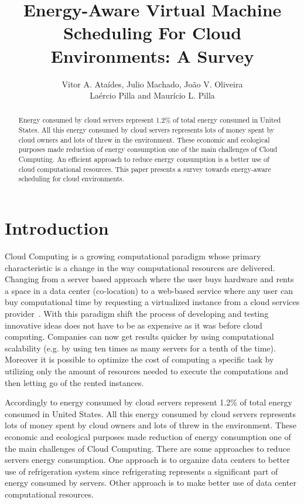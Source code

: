 \documentclass{article}
\title{Energy-Aware Virtual Machine Scheduling For Cloud Environments: A Survey}
\author{Vitor A. Ataídes\inst{1}, Julio Machado\inst{1}, João V. Oliveira\inst{1} \\ Laércio Pilla\inst{2} and  Maurício L. Pilla\inst{1}}
\begin{document}
\maketitle

\begin{abstract}
    Energy consumed by cloud servers represent 1.2\% of total energy consumed in United States. All this energy consumed by cloud servers represents lots of money spent by cloud owners and lots of  threw in the environment. These economic and ecological purposes made reduction of energy consumption one of the main challenges of Cloud Computing. An efficient approach to reduce energy consumption is a better use of cloud computational resources. This paper presents a survey towards energy-aware scheduling for cloud environments. 
\end{abstract}


\section{Introduction}

Cloud Computing is a growing computational paradigm whose primary characteristic is a change in the way computational resources are delivered. Changing from a server based approach where the user buys hardware and rents a space in a data center (co-location) to a web-based service where any user can buy computational time by requesting a virtualized instance from a cloud services provider~\cite{NIST:2011}. With this paradigm shift the process of developing and testing innovative ideas does not have to be as expensive as it was before cloud computing. Companies can now get results quicker by using computational scalability (e.g. by using ten times as many servers for a tenth of the time). Moreover it is possible to optimize the cost of computing a specific task by utilizing only the amount of resources needed to execute the computations and then letting go of the rented instances.

Accordingly to \cite{Koomey} energy consumed by cloud servers represent 1.2\% of total energy consumed in United States. All this energy consumed by cloud servers represents lots of money spent by cloud owners and lots of  threw in the environment. These economic and ecological purposes made reduction of energy consumption one of the main challenges of Cloud Computing. There are some approaches to reduce servers energy consumption. One approach is to organize data centers to better use of refrigeration system since refrigerating represents a significant part of energy consumed by servers. Other approach is to make better use of data center computational resources.
\end{document}
